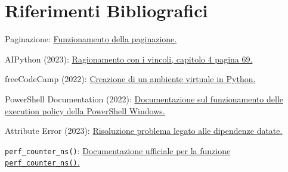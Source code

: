 \documentclass[12pt, letterpaper]{article}
\begin{document}
\section{Riferimenti Bibliografici}

\begin{thebibliography}{100}
      Paginazione: \href{https://www.educative.io/answers/what-is-pagination}{
            Funzionamento della paginazione.
      }

      AIPython (2023): \href{https://artint.info/AIPython/aipython/aipython.pdf}{
            Ragionamento con i vincoli, capitolo 4 pagina 69.
      }

      freeCodeCamp (2022):  \href{https://www.freecodecamp.org/news/how-to-setup-virtual-environments-in-python/}{
            Creazione di un ambiente virtuale in Python.
      }

      PowerShell Documentation (2022):
      \href{https://learn.microsoft.com/en-gb/powershell/module/microsoft.powershell.core/about/about_execution_policies?view=powershell-7.4}{
            Documentazione sul funzionamento delle execution policy della PowerShell Windows.
      }

      Attribute Error (2023): \href{https://stackoverflow.com/questions/70749690/attributeerror-module-collections-has-no-attribute-mapping}{
            Risoluzione problema legato alle dipendenze datate.
      }

      \lstinline|perf_counter_ns()|: \href{https://docs.python.org/3/library/time.html#time.perf_counter_ns}{
            Documentazione ufficiale per la funzione \lstinline|perf_counter_ns()|.
      }
\end{thebibliography}
\end{document}
